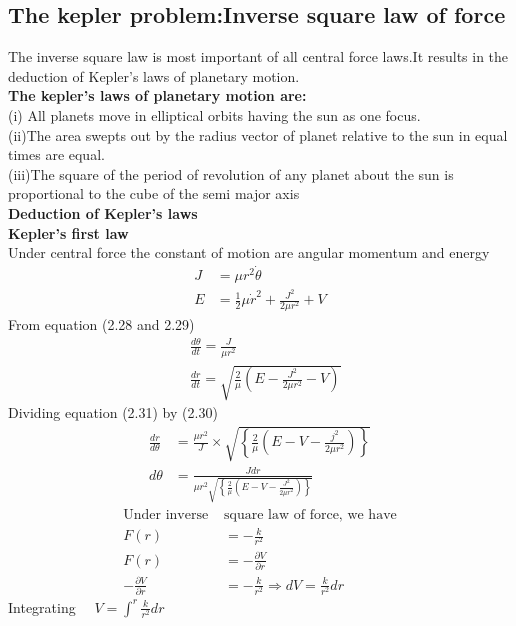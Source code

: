 \subsection{The kepler problem:Inverse square law of force}
The inverse square law is most important of all central force laws.It results in the deduction of Kepler's laws of planetary motion.\\
\textbf{The kepler's laws of planetary motion are:}\\
(i) All planets move in elliptical orbits having the sun as one focus.\\
(ii)The area swepts out by the radius vector of planet relative to the sun in equal times are equal.\\
(iii)The square of the period of revolution of any planet about the sun is proportional to the cube of the semi major axis\\
\textbf{Deduction of Kepler's laws}\\
\textbf{Kepler's first law}\\
Under central force the constant of motion are angular momentum and energy
\begin{align}
J&=\mu r^{2} \dot{\theta} \\
 E&=\frac{1}{2} \mu \dot{r}^{2}+\frac{J^{2}}{2 \mu r^{2}}+V
\end{align}
From equation (2.28 and 2.29)\\
\begin{align}
	&\frac{d \theta}{d t}=\frac{J}{\mu r^{2}} \\
	&\frac{d r}{d t}=\sqrt{\frac{2}{\mu}\left(E-\frac{J^{2}}{2 \mu r^{2}}-V\right)}
\end{align}
Dividing equation (2.31) by (2.30)
\begin{align}
	\frac{dr}{d \theta} &=\frac{\mu r^{2}}{J} \times \sqrt{\left\{\frac{2}{\mu}\left(E-V-\frac{j^{2}}{2 \mu r^{2}}\right)\right\}} \\
	d \theta &=\frac{J d r}{\mu r^{2} \sqrt{\left\{\frac{2}{\mu}\left(E-V-\frac{J^{2}}{2 \mu r^{2}}\right)\right\}}}
\end{align}
\begin{align*}
\text{Under inverse }&\text{square law of force, we have}\\
F(r)&=-\frac{k}{r^{2}} \\
F(r)&=-\frac{\partial V}{\partial r} \\
-\frac{\partial V}{\partial r}&=-\frac{k}{r^{2}} \Rightarrow d V=\frac{k}{r^{2}} d r
\end{align*}
Integrating $\quad V=\int^{r} \frac{k}{r^{2}} d r$\\
